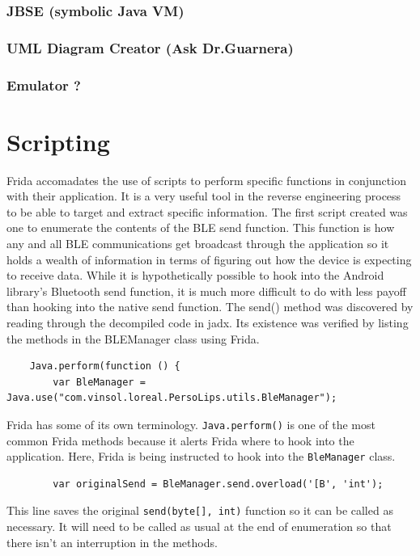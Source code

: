 \subsubsection{JBSE (symbolic Java VM)}
\subsubsection{UML Diagram Creator (Ask Dr.Guarnera)}
\subsubsection{Emulator ?}

\section{Scripting}
Frida accomadates the use of scripts to perform specific functions in conjunction with their application. It is a very useful tool in the reverse engineering process to be able to target and extract specific information. The first script created was one to enumerate the contents of the BLE send function. This function is how any and all BLE communications get broadcast through the application so it holds a wealth of information in terms of figuring out how the device is expecting to receive data. While it is hypothetically possible to hook into the Android library's Bluetooth send function, it is much more difficult to do with less payoff than hooking into the native send function. The send() method was discovered by reading through the decompiled code in jadx. Its existence was verified by listing the methods in the BLEManager class using Frida.
\begin{lstlisting}
	Java.perform(function () {
		var BleManager = Java.use("com.vinsol.loreal.PersoLips.utils.BleManager");
	\end{lstlisting}
	Frida has some of its own terminology. \texttt{Java.perform()} is one of the most common Frida methods because it alerts Frida where to hook into the application. Here, Frida is being instructed to hook into the \texttt{BleManager} class.
	
	\begin{lstlisting}
		var originalSend = BleManager.send.overload('[B', 'int');
	\end{lstlisting}
	This line saves the original \texttt{send(byte[], int)} function so it can be called as necessary. It will need to be called as usual at the end of enumeration so that there isn’t an interruption in the methods.
	
